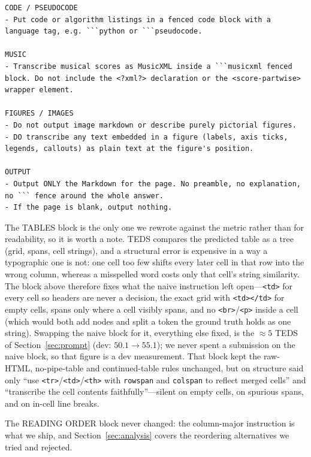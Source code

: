 \documentclass[11pt]{article}
\begin{document}
\begin{lstlisting}[style=prompt]
CODE / PSEUDOCODE
- Put code or algorithm listings in a fenced code block with a language tag, e.g. ```python or ```pseudocode.

MUSIC
- Transcribe musical scores as MusicXML inside a ```musicxml fenced block. Do not include the <?xml?> declaration or the <score-partwise> wrapper element.

FIGURES / IMAGES
- Do not output image markdown or describe purely pictorial figures.
- DO transcribe any text embedded in a figure (labels, axis ticks, legends, callouts) as plain text at the figure's position.

OUTPUT
- Output ONLY the Markdown for the page. No preamble, no explanation, no ``` fence around the whole answer.
- If the page is blank, output nothing.
\end{lstlisting}

\noindent The TABLES block is the only one we rewrote against the metric rather than
for readability, so it is worth a note. TEDS compares the predicted table as a tree
(grid, spans, cell strings), and a structural error is expensive in a way a
typographic one is not: one cell too few shifts every later cell in that row into the
wrong column, whereas a misspelled word costs only that cell's string similarity. The
block above therefore fixes what the naive instruction left open---\texttt{<td>} for
every cell so headers are never a decision, the exact grid with \texttt{<td></td>} for
empty cells, spans only where a cell visibly spans, and no \texttt{<br>}/\texttt{<p>}
inside a cell (which would both add nodes and split a token the ground truth holds as
one string). Swapping the naive block for it, everything else fixed, is the
${\approx}5$ TEDS of Section~\ref{sec:prompt} (dev: $50.1 \rightarrow 55.1$); we never
spent a submission on the naive block, so that figure is a dev measurement. That block
kept the raw-HTML, no-pipe-table and continued-table rules unchanged, but on structure
said only ``use \texttt{<tr>}/\texttt{<td>}/\texttt{<th>} with \texttt{rowspan} and
\texttt{colspan} to reflect merged cells'' and ``transcribe the cell contents
faithfully''---silent on empty cells, on spurious spans, and on in-cell line breaks.

\noindent The READING ORDER block never changed: the column-major instruction is what
we ship, and Section~\ref{sec:analysis} covers the reordering alternatives we tried
and rejected.
\end{document}
